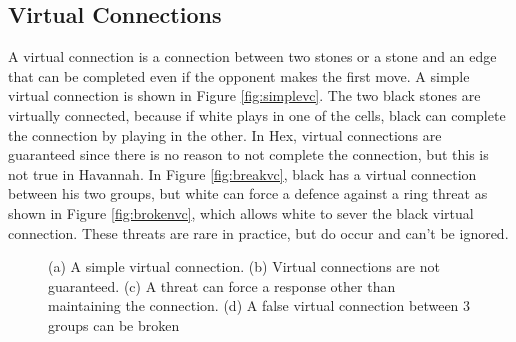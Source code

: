 \subsection{Virtual Connections}

A virtual connection is a connection between two stones or a stone and an edge that can be completed even if the opponent makes the first move. A simple virtual connection is shown in Figure \ref{fig:simplevc}. The two black stones are virtually connected, because if white plays in one of the cells, black can complete the connection by playing in the other. In Hex, virtual connections are guaranteed since there is no reason to not complete the connection, but this is not true in Havannah. In Figure \ref{fig:breakvc}, black has a virtual connection between his two groups, but white can force a defence against a ring threat as shown in Figure \ref{fig:brokenvc}, which allows white to sever the black virtual connection. These threats are rare in practice, but do occur and can't be ignored.


\begin{figure}
  \centering


	\caption{(a) A simple virtual connection. (b) Virtual connections are not guaranteed. (c) A threat can force a response other than maintaining the connection. (d) A false virtual connection between 3 groups can be broken}
	\label{fig:ringvc}
\end{figure}


